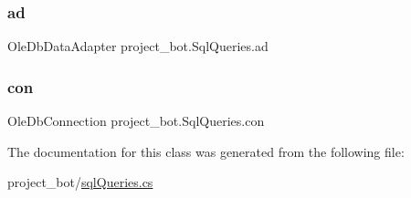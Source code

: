 \subsubsection{\texorpdfstring{ad}{ad}}
{\footnotesize\ttfamily Ole\+Db\+Data\+Adapter project\+\_\+bot.\+Sql\+Queries.\+ad\hspace{0.3cm}{\ttfamily [private]}}

\mbox{\label{classproject__bot_1_1_sql_queries_a88f05b8fbe30a50c5a365460137c1343}} 
\subsubsection{\texorpdfstring{con}{con}}
{\footnotesize\ttfamily Ole\+Db\+Connection project\+\_\+bot.\+Sql\+Queries.\+con\hspace{0.3cm}{\ttfamily [private]}}



The documentation for this class was generated from the following file\+:\begin{DoxyCompactItemize}
\item 
project\+\_\+bot/\hyperlink{sql_queries_8cs}{sql\+Queries.\+cs}\end{DoxyCompactItemize}
